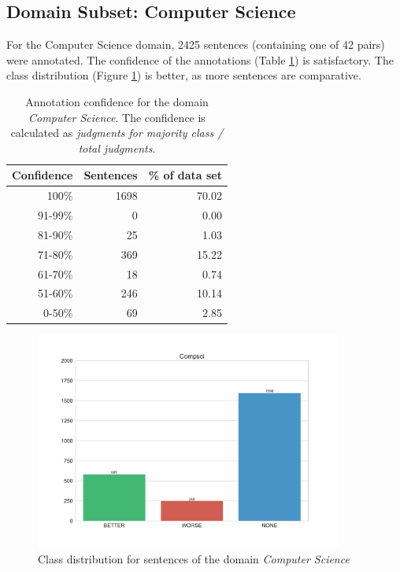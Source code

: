 \subsection{Domain Subset: Computer Science}
For the Computer Science domain, 2425 sentences (containing one of 42 pairs) were annotated. The confidence of the annotations (Table \ref{fig:compsci_agg}) is satisfactory. The class distribution (Figure \ref{fig:compsci_fin}) is better, as more sentences are comparative.

\begin{table}[htb]
\caption{Annotation confidence for the domain \emph{Computer Science}. The confidence is calculated as \emph{judgments for majority class / total judgments}. }
\label{fig:compsci_agg}
\centering
\begin{tabular}{@{}rrr@{}}
\toprule
Confidence & Sentences & \% of data set \\
\midrule
100\%	&	1698	&	70.02	 \\ 
91-99\%	&	0	&	0.00	 \\ 
81-90\%	&	25	&	1.03	 \\ 
71-80\%	&	369	&	15.22	 \\ 
61-70\%	&	18	&	0.74	 \\ 
51-60\%	&	246	&	10.14	 \\ 
0-50\%	&	69	&	2.85	 \\ 
\bottomrule
\end{tabular}
\end{table}

\begin{figure}[htb]
\centering
\caption{Class distribution for sentences of the domain \emph{Computer Science}}
\label{fig:compsci_fin}
\includegraphics[width=0.9\textwidth]{images/dataset/Compsci-dist}
\end{figure}

